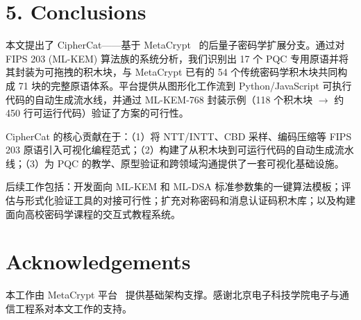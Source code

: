\documentclass[preprint,12pt,a4paper]{elsarticle}
\begin{document}
\section*{5. Conclusions}

本文提出了 CipherCat——基于 MetaCrypt~\cite{metacrypt2024} 的后量子密码学扩展分支。通过对 FIPS 203 (ML-KEM) 算法族的系统分析，我们识别出 17 个 PQC 专用原语并将其封装为可拖拽的积木块，与 MetaCrypt 已有的 54 个传统密码学积木块共同构成 71 块的完整原语体系。平台提供从图形化工作流到 Python/JavaScript 可执行代码的自动生成流水线，并通过 ML-KEM-768 封装示例（118 个积木块 $\rightarrow$ 约 450 行可运行代码）验证了方案的可行性。

CipherCat 的核心贡献在于：（1）将 NTT/INTT、CBD 采样、编码压缩等 FIPS 203 原语引入可视化编程范式；（2）构建了从积木块到可运行代码的自动生成流水线；（3）为 PQC 的教学、原型验证和跨领域沟通提供了一套可视化基础设施。

后续工作包括：开发面向 ML-KEM 和 ML-DSA 标准参数集的一键算法模板；评估与形式化验证工具的对接可行性；扩充对称密码和消息认证码积木库；以及构建面向高校密码学课程的交互式教程系统。


\section*{Acknowledgements}
\label{sec:ack}

本工作由 MetaCrypt 平台~\cite{metacrypt2024} 提供基础架构支撑。感谢北京电子科技学院电子与通信工程系对本文工作的支持。

\end{document}
